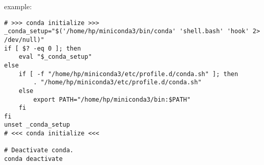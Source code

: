 example:
\begin{verbatim}
# >>> conda initialize >>>
_conda_setup="$('/home/hp/miniconda3/bin/conda' 'shell.bash' 'hook' 2> /dev/null)"
if [ $? -eq 0 ]; then
    eval "$_conda_setup"
else
    if [ -f "/home/hp/miniconda3/etc/profile.d/conda.sh" ]; then
        . "/home/hp/miniconda3/etc/profile.d/conda.sh"
    else
        export PATH="/home/hp/miniconda3/bin:$PATH"
    fi
fi
unset _conda_setup
# <<< conda initialize <<<

# Deactivate conda.
conda deactivate
\end{verbatim}